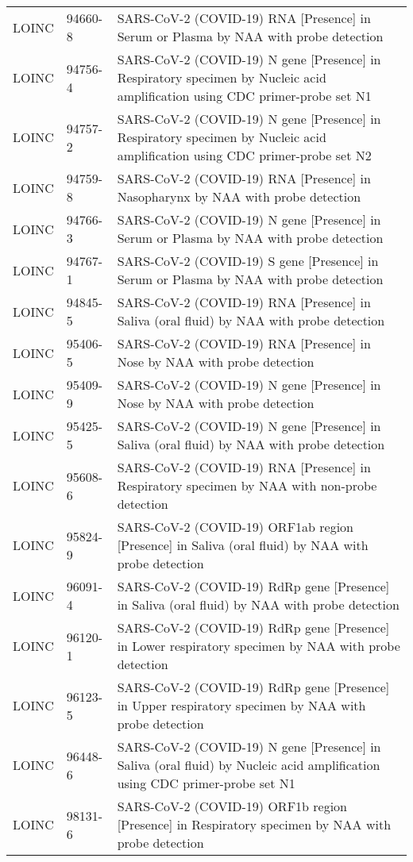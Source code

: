 \begin{longtable}{p{}p{}p{}}
  LOINC & 94660-8 & SARS-CoV-2 (COVID-19) RNA [Presence] in Serum or Plasma by NAA with probe detection \\ 
  LOINC & 94756-4 & SARS-CoV-2 (COVID-19) N gene [Presence] in Respiratory specimen by Nucleic acid amplification using CDC primer-probe set N1 \\ 
  LOINC & 94757-2 & SARS-CoV-2 (COVID-19) N gene [Presence] in Respiratory specimen by Nucleic acid amplification using CDC primer-probe set N2 \\ 
  LOINC & 94759-8 & SARS-CoV-2 (COVID-19) RNA [Presence] in Nasopharynx by NAA with probe detection \\ 
  LOINC & 94766-3 & SARS-CoV-2 (COVID-19) N gene [Presence] in Serum or Plasma by NAA with probe detection \\ 
  LOINC & 94767-1 & SARS-CoV-2 (COVID-19) S gene [Presence] in Serum or Plasma by NAA with probe detection \\ 
  LOINC & 94845-5 & SARS-CoV-2 (COVID-19) RNA [Presence] in Saliva (oral fluid) by NAA with probe detection \\ 
  LOINC & 95406-5 & SARS-CoV-2 (COVID-19) RNA [Presence] in Nose by NAA with probe detection \\ 
  LOINC & 95409-9 & SARS-CoV-2 (COVID-19) N gene [Presence] in Nose by NAA with probe detection \\ 
  LOINC & 95425-5 & SARS-CoV-2 (COVID-19) N gene [Presence] in Saliva (oral fluid) by NAA with probe detection \\ 
  LOINC & 95608-6 & SARS-CoV-2 (COVID-19) RNA [Presence] in Respiratory specimen by NAA with non-probe detection \\ 
  LOINC & 95824-9 & SARS-CoV-2 (COVID-19) ORF1ab region [Presence] in Saliva (oral fluid) by NAA with probe detection \\ 
  LOINC & 96091-4 & SARS-CoV-2 (COVID-19) RdRp gene [Presence] in Saliva (oral fluid) by NAA with probe detection \\ 
  LOINC & 96120-1 & SARS-CoV-2 (COVID-19) RdRp gene [Presence] in Lower respiratory specimen by NAA with probe detection \\ 
  LOINC & 96123-5 & SARS-CoV-2 (COVID-19) RdRp gene [Presence] in Upper respiratory specimen by NAA with probe detection \\ 
  LOINC & 96448-6 & SARS-CoV-2 (COVID-19) N gene [Presence] in Saliva (oral fluid) by Nucleic acid amplification using CDC primer-probe set N1 \\ 
  LOINC & 98131-6 & SARS-CoV-2 (COVID-19) ORF1b region [Presence] in Respiratory specimen by NAA with probe detection \\ 

\end{longtable}
